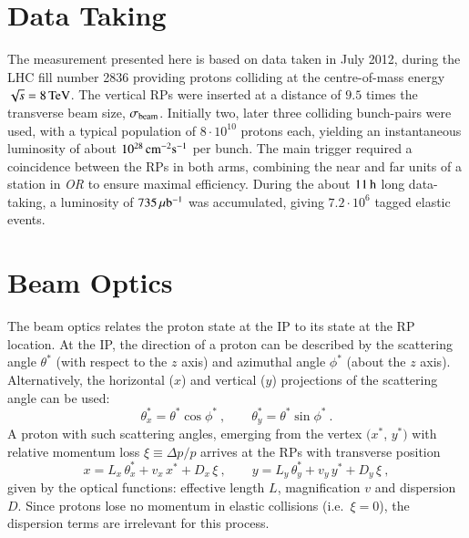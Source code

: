 \section{Data Taking}
\label{sec:data taking}

The measurement presented here is based on data taken in July 2012, during the LHC fill number 2836 providing protons colliding at the centre-of-mass energy $\sqrt s = 8\,{\rm TeV}$. The vertical RPs were inserted at a distance of $9.5$ times the transverse beam size, $\sigma_{\rm beam}$. Initially two, later three colliding bunch-pairs were used, with a typical population of $8\cdot10^{10}$ protons each, yielding an instantaneous luminosity of about $10^{28}\,{\rm cm^{-2}s^{-1}}$ per bunch. The main trigger required a coincidence between the RPs in both arms, combining the near and far units of a station in \textit{OR} to ensure maximal efficiency. During the about $11\,{\rm h}$ long data-taking, a luminosity of $735\,{\rm \mu b^{-1}}$ was accumulated, giving $7.2\cdot 10^6$ tagged elastic events.



\section{Beam Optics}
\label{sec:beam optics}

The beam optics relates the proton state at the IP to its state at the RP location. At the IP, the direction of a proton can be described by the scattering angle $\theta^*$ (with respect to the $z$ axis) and azimuthal angle $\phi^*$ (about the $z$ axis). Alternatively, the horizontal ($x$) and vertical ($y$) projections of the scattering angle can be used:
\begin{equation}
\label{eq:scatt angle}
\theta_x^* = \theta^* \cos\phi^*\ ,\qquad \theta_y^* = \theta^* \sin\phi^*\ .
\end{equation}
A proton with such scattering angles, emerging from the vertex $(x^*$, $y^*)$ with relative momentum loss $\xi \equiv \Delta p / p$ arrives at the RPs with transverse position
\begin{equation}
\label{eq:prot trans}
	x = L_x\, \theta_x^* + v_x\, x^* + D_x\, \xi\ ,\qquad y = L_y\, \theta_y^* + v_y\, y^* + D_y\, \xi\ ,
\end{equation}
given by the optical functions: effective length $L$, magnification $v$ and dispersion $D$. Since protons lose no momentum in elastic collisions 
(i.e.~$\xi = 0$), the dispersion terms are irrelevant for this process.

